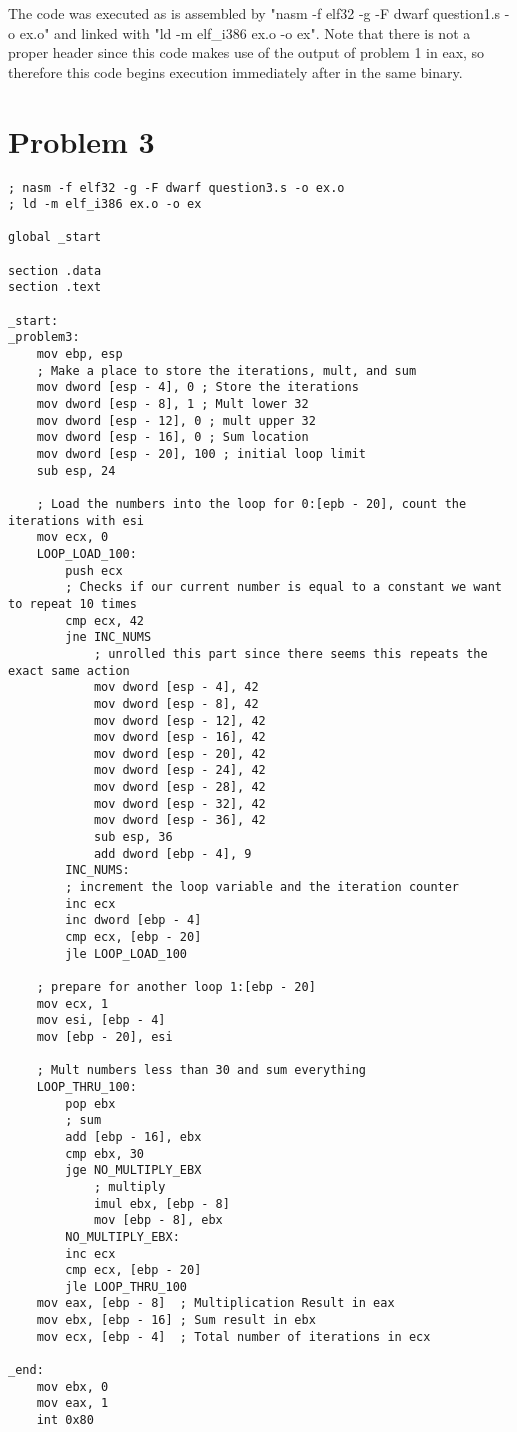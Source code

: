 \documentclass[11pt]{article}
\begin{document}
The code was executed as is assembled by "nasm -f elf32 -g -F dwarf question1.s -o ex.o" and linked with "ld -m elf\_i386 ex.o -o ex". Note that there is not a proper header since this code makes use of the output of problem 1 in eax, so therefore this code begins execution immediately after in the same binary.

\pagebreak

\section*{Problem 3}
\begin{lstlisting}
; nasm -f elf32 -g -F dwarf question3.s -o ex.o
; ld -m elf_i386 ex.o -o ex

global _start

section .data
section .text

_start:
_problem3:
    mov ebp, esp
    ; Make a place to store the iterations, mult, and sum
    mov dword [esp - 4], 0 ; Store the iterations
    mov dword [esp - 8], 1 ; Mult lower 32
    mov dword [esp - 12], 0 ; mult upper 32
    mov dword [esp - 16], 0 ; Sum location
    mov dword [esp - 20], 100 ; initial loop limit
    sub esp, 24
    
    ; Load the numbers into the loop for 0:[epb - 20], count the iterations with esi
    mov ecx, 0
    LOOP_LOAD_100:
        push ecx
        ; Checks if our current number is equal to a constant we want to repeat 10 times
        cmp ecx, 42
        jne INC_NUMS
            ; unrolled this part since there seems this repeats the exact same action
            mov dword [esp - 4], 42
            mov dword [esp - 8], 42
            mov dword [esp - 12], 42
            mov dword [esp - 16], 42
            mov dword [esp - 20], 42
            mov dword [esp - 24], 42
            mov dword [esp - 28], 42
            mov dword [esp - 32], 42
            mov dword [esp - 36], 42
            sub esp, 36
            add dword [ebp - 4], 9
        INC_NUMS:
        ; increment the loop variable and the iteration counter
        inc ecx
        inc dword [ebp - 4]
        cmp ecx, [ebp - 20]
        jle LOOP_LOAD_100

    ; prepare for another loop 1:[ebp - 20]
    mov ecx, 1
    mov esi, [ebp - 4]
    mov [ebp - 20], esi

    ; Mult numbers less than 30 and sum everything
    LOOP_THRU_100:
        pop ebx
        ; sum
        add [ebp - 16], ebx
        cmp ebx, 30
        jge NO_MULTIPLY_EBX
            ; multiply
            imul ebx, [ebp - 8]
            mov [ebp - 8], ebx
        NO_MULTIPLY_EBX:
        inc ecx
        cmp ecx, [ebp - 20]
        jle LOOP_THRU_100
    mov eax, [ebp - 8]  ; Multiplication Result in eax
    mov ebx, [ebp - 16] ; Sum result in ebx
    mov ecx, [ebp - 4]  ; Total number of iterations in ecx 
    
_end:
    mov ebx, 0
    mov eax, 1
    int 0x80
\end{lstlisting}
\end{document}
